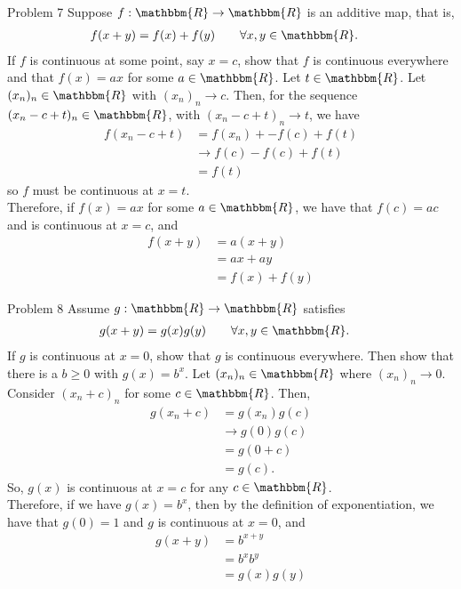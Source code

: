 \documentclass[8pt]{extarticle}
\newcommand{\R}{\mathbbm{R}}
\begin{document}
  \begin{problem}{Problem 7}
    Suppose $f: \R \rightarrow \R$ is an additive map, that is,
    \begin{align*}
      f(x+y) &= f(x) + f(y) \tag*{$\forall x,y\in \R$.}
    \end{align*}
    If $f$ is continuous at some point, say $x=c$, show that $f$ is continuous everywhere and that $f(x) = ax$ for some $a\in\R$.
    \tcblower
    Let $t\in\R$. Let $(x_n)_n \in \R$ with $(x_n)_n \rightarrow c$. Then, for the sequence $(x_n - c + t)_n\in\R$, with $(x_n - c + t)_n \rightarrow t$, we have
    \begin{align*}
      f(x_n - c + t) &= f(x_n) + - f(c) + f(t)\\
                 &\rightarrow f(c) - f(c) + f(t)\\
                 &= f(t)
    \end{align*}
    so $f$ must be continuous at $x = t$.\\

    Therefore, if $f(x) = ax$ for some $a\in\R$, we have that $f(c) = ac$ and is continuous at $x=c$, and
    \begin{align*}
      f(x+y) &= a(x+y)\\
             &= ax + ay\\
             &= f(x) + f(y)
    \end{align*}
  \end{problem}
  \begin{problem}{Problem 8}
    Assume $g: \R\rightarrow \R$ satisfies
    \begin{align*}
      g(x+y) &= g(x)g(y) \tag*{$\forall x,y\in\R$.}
    \end{align*}
    If $g$ is continuous at $x=0$, show that $g$ is continuous everywhere. Then show that there is a $b\geq 0$ with $g(x) = b^x$.
    \tcblower
    Let $(x_n)_n\in \R$ where $(x_n)_n \rightarrow 0$. Consider $(x_n + c)_n$ for some $c\in\R$. Then,
    \begin{align*}
      g(x_n + c) &= g(x_n)g(c)\\
                 &\rightarrow g(0)g(c)\\
                 &= g(0+c)\\
                 &= g(c).
    \end{align*}
    So, $g(x)$ is continuous at $x=c$ for any $c\in\R$.\\

    Therefore, if we have $g(x) = b^x$, then by the definition of exponentiation, we have that $g(0) = 1$ and $g$ is continuous at $x=0$, and
    \begin{align*}
      g(x+y) &= b^{x+y}\\
             &= b^xb^y\\
             &= g(x)g(y)
    \end{align*}
  \end{problem}
\end{document}
